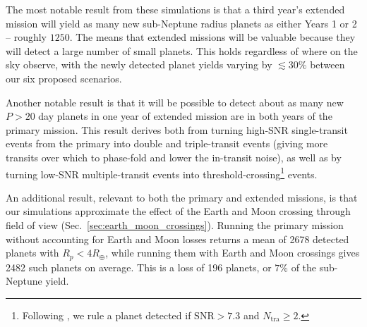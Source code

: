 The most notable result from these simulations is that a third year's extended mission will yield as many new sub-Neptune radius planets as either Years 1 or 2 -- roughly $1250$.
The means that extended missions will be valuable because they will detect a large number of small planets.
This holds regardless of where on the sky observe, with the newly detected planet yields varying by $\lesssim 30\%$ between our six proposed scenarios.

Another notable result is that it will be possible to detect about as many new $P>20$ day planets in one year of \tesss extended mission are in both years of the primary mission.
This result derives both from turning high-SNR single-transit events from the primary into double and triple-transit events (giving more transits over which to phase-fold and lower the in-transit noise), as well as by turning low-SNR multiple-transit events into threshold-crossing\footnote{Following \citet{Sullivan_2015}, we rule a planet detected if $\mathrm{SNR} > 7.3$ and $N_\mathrm{tra}\geq 2$.} events.

An additional result, relevant to both the primary and extended missions, is that our simulations approximate the effect of the Earth and Moon crossing through \tesss field of view (Sec.~\ref{sec:earth_moon_crossings}).
Running the primary mission without accounting for Earth and Moon losses returns a mean of 2678 detected planets with $R_p<4R_\oplus$, while running them with Earth and Moon crossings gives 2482 such planets on average.
This is a loss of 196 planets, or $7\%$ of the sub-Neptune yield.


